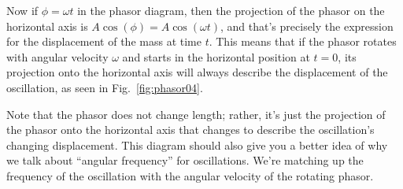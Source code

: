 Now if $\phi = \omega t$ in the phasor diagram, then the projection of
the phasor on the horizontal axis is $A\cos{(\phi)} = A\cos{(\omega
  t)}$, and that's precisely the expression for the displacement of
the mass at time $t$. This means that if the phasor rotates with
angular velocity $\omega$ and starts in the horizontal position at $t
= 0$, its projection onto the horizontal axis will always describe the
displacement of the oscillation, as seen in Fig.~\ref{fig:phasor04}.


Note that the phasor does not change length; rather, it's just the
projection of the phasor onto the horizontal axis that changes to
describe the oscillation's changing displacement.  This diagram should
also give you a better idea of why we talk about ``angular frequency''
for oscillations. We're matching up the frequency of the oscillation
with the angular velocity of the rotating phasor.

